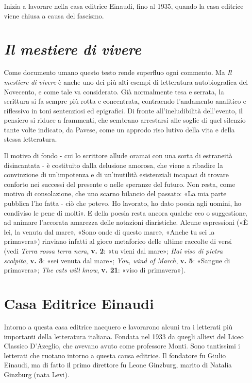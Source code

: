 \documentclass[a4paper, twoside, titlepage]{book}
\newcounter{mar}
\begin{document}
Inizia a lavorare nella casa editrice Einaudi, fino al 1935, quando la casa editrice viene chiusa a causa del fascismo.

\section{\textit{Il mestiere di vivere}}

Come documento umano questo testo rende superfluo ogni commento. Ma \textit{Il mestiere di vivere} è anche uno dei più alti esempi di letteratura autobiografica del Novecento, e come tale va considerato. Già normalmente tesa e serrata, la scrittura si fa sempre più rotta e concentrata, contraendo l'andamento analitico e riflessivo in toni sentenziosi ed epigrafici. Di fronte all'ineludibilità dell'evento, il pensiero si riduce a frammenti, che sembrano arrestarsi alle soglie di quel silenzio tante volte indicato, da Pavese, come un approdo riso lutivo della vita e della stessa letteratura.

Il motivo di fondo - cui lo scrittore allude oramai con una sorta di estraneità disincantata - è costituito dalla delusione amorosa, che viene a ribadire la convinzione di un'impotenza e di un'inutilità esistenziali incapaci di trovare conforto nei successi del presente o nelle speranze del futuro. Non resta, come motivo di consolazione, che uno scarno bilancio del passato: «La mia parte pubblica l'ho fatta - ciò che potevo. Ho lavorato, ho dato poesia agli uomini, ho condiviso le pene di molti». E della poesia resta ancora qualche eco o suggestione, ad animare l'accorata amarezza delle notazioni diaristiche. Alcune espressioni («È lei, la venuta dal mare», «Sono onde di questo mare», «Anche tu sei la primavera») rinviano infatti al gioco metaforico delle ultime raccolte di versi (vedi \textit{Terra rossa terra nera}, \textbf{v. 2}: «tu vieni dal mare»; \textit{Hai viso di pietra scolpita}, \textbf{v. 3}: «sei venuta dal mare»; \textit{You, wind of March}, \textbf{v. 5}: «Sangue di primavera»; \textit{The cats will know}, \textbf{v. 21}: «viso di primavera»).

\section{Casa Editrice Einaudi}

Intorno a questa casa editrice nacquero e lavorarono alcuni tra i letterati più importanti della letteratura italiana. Fondata nel 1933 da quegli allievi del Liceo Classico D'Azeglio, che avevano avuto come professore Monti.
Sono tantissimi i letterati che ruotano intorno a questa causa editrice. Il fondatore fu Giulio Einaudi, ma di fatto il primo direttore fu Leone Ginzburg, marito di Natalia Ginzburg (nata Levi).
\end{document}
